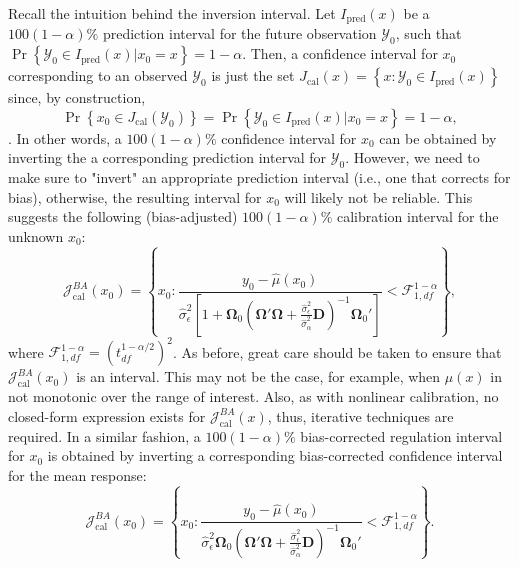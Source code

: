 \documentclass[cmfont,usenames,dvipsnames,leqno]{afit-etd}\usepackage[]{graphicx}\usepackage[]{color}
\newcommand{\mc}[1]{\ensuremath{\mathcal{#1}}}
\newcommand{\wh}[1]{\ensuremath{\widehat{#1}}}
\begin{document}
Recall the intuition behind the inversion interval. Let $I_\mathrm{pred}(x)$ be a $100(1 - \alpha)\%$ prediction interval for the future observation $\mc{Y}_0$, such that $\Pr\left\{ \mc{Y}_0 \in I_\mathrm{pred}(x) | x_0 = x \right\} = 1 - \alpha$. Then, a confidence interval for $x_0$ corresponding to an observed $\mc{Y}_0$ is just the set $J_\mathrm{cal}(x) = \left\{x : \mc{Y}_0 \in I_\mathrm{pred}(x)\right\}$ since, by construction, 
\begin{equation*}
\Pr\left\{x_0 \in J_\mathrm{cal}(\mc{Y}_0)\right\} = \Pr\left\{\mc{Y}_0 \in I_\mathrm{pred}(x) | x_0 = x\right\} = 1 - \alpha,
\end{equation*}
\citep{clark_calibration_1980}. In other words, a $100(1 - \alpha)\%$ confidence interval for $x_0$ can be obtained by inverting the a corresponding prediction interval for $\mc{Y}_0$. However, we need to make sure to "invert" an appropriate prediction interval (i.e., one that corrects for bias), otherwise, the resulting interval for $x_0$ will likely not be reliable. This suggests the following (bias-adjusted) $100(1-\alpha)\%$ calibration interval for the unknown $x_0$:
\begin{equation}
\label{eqn:bc-inversion-interval}
  \mc{J}_\mathrm{cal}^{BA}(x_0) = \left\{x_0: \frac{y_0 - \wh{\mu}(x_0)}{\wh{\sigma}_\epsilon^2\left[1 + \bm{\Omega}_0\left(\bm{\Omega}'\bm{\Omega} + \frac{\wh{\sigma}_\epsilon^2}{\wh{\sigma}_\alpha^2}\bm{D}\right)^{-1}\bm{\Omega}_0'\right]} < \mc{F}_{1, df}^{1-\alpha}\right\},
\end{equation}
where $\mc{F}_{1, df}^{1-\alpha} = \left(t_{df}^{1 - \alpha/2}\right)^2$. As before, great care should be taken to ensure that $\mc{J}_\mathrm{cal}^{BA}(x_0)$ is an interval. This may not be the case, for example, when $\mu(x)$ in not monotonic over the range of interest. Also, as with nonlinear calibration, no closed-form expression exists for $\mc{J}_\mathrm{cal}^{BA}(x)$, thus, iterative techniques are required. In a similar fashion, a $100(1-\alpha)\%$ bias-corrected regulation interval for $x_0$ is obtained by inverting a corresponding bias-corrected confidence interval for the mean response:
\begin{equation*}
  \mc{J}_\mathrm{cal}^{BA}(x_0) = \left\{x_0: \frac{y_0 - \wh{\mu}(x_0)}{\wh{\sigma}_\epsilon^2\bm{\Omega}_0\left(\bm{\Omega}'\bm{\Omega} + \frac{\wh{\sigma}_\epsilon^2}{\wh{\sigma}_\alpha^2}\bm{D}\right)^{-1}\bm{\Omega}_0'} < \mc{F}_{1, df}^{1-\alpha}\right\}.
\end{equation*}
\end{document}
